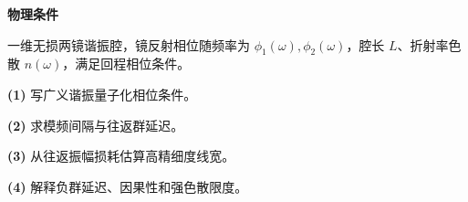 \textbf{物理条件}\par 一维无损两镜谐振腔，镜反射相位随频率为 \(\phi_1(\omega),\phi_2(\omega)\)，腔长 \(L\)、折射率色散 \(n(\omega)\)，满足回程相位条件。
\par\noindent\textbf{(1)} 写广义谐振量子化相位条件。
\par\noindent\textbf{(2)} 求模频间隔与往返群延迟。
\par\noindent\textbf{(3)} 从往返振幅损耗估算高精细度线宽。
\par\noindent\textbf{(4)} 解释负群延迟、因果性和强色散限度。
